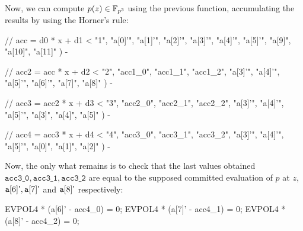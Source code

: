
Now, we can compute $p(z) \in \mathbb{F}_{p^3}$ using the previous function, accumulating the results by using the Horner's rule:

\begin{js}
// acc = d0 * x + d1 
<%
        "1", 
        "a[0]'", 
        "a[1]'", 
        "a[2]'", 
        "a[3]'", 
        "a[4]'", 
        "a[5]'", 
        "a[9]", 
        "a[10]", 
        "a[11]"
    ) 
-%
\end{js}

\begin{js}
// acc2 = acc * x + d2 
<%
        "2",
        "acc1_0", 
        "acc1_1", 
        "acc1_2", 
        "a[3]'", 
        "a[4]'", 
        "a[5]'", 
        "a[6]'", 
        "a[7]", 
        "a[8]"
    ) 
-%
\end{js}

\begin{js}
// acc3 = acc2 * x + d3 
<%
        "3", 
        "acc2_0", 
        "acc2_1", 
        "acc2_2", 
        "a[3]'", 
        "a[4]'", 
        "a[5]'", 
        "a[3]", 
        "a[4]", 
        "a[5]"
    ) 
-%
\end{js}

\begin{js}
// acc4 = acc3 * x + d4 
<%
        "4", 
        "acc3_0", 
        "acc3_1", 
        "acc3_2", 
        "a[3]'", 
        "a[4]'", 
        "a[5]'", 
        "a[0]", 
        "a[1]", 
        "a[2]"
    ) 
-%
\end{js}

Now, the only what remains is to check that the last values obtained $\texttt{acc3\_0}, \texttt{acc3\_1}, \texttt{acc3\_2}$ are equal to the supposed committed evaluation of $p$ at $z$, $\texttt{a}[6] \textsf{'}, \texttt{a}[7] \textsf{'}$ and $\texttt{a}[8] \textsf{'}$ respectively:

\begin{pil}
EVPOL4 * (a[6]' - acc4_0) = 0;
EVPOL4 * (a[7]' - acc4_1) = 0;
EVPOL4 * (a[8]' - acc4_2) = 0;
\end{pil}